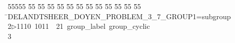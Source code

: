 %
%
\begin{tabbing}
55555 \= 55 \= 55 \= 55 \= 55 \= 55 \= 55 \= 55 \= 55 \= 55 \= 55 \= 55 \= 55 \= \>DELANDTSHEER\_DOYEN\_PROBLEM\_3\_7\_GROUP1=subgroup\ \\[0pt]
2\>$\triangleright$\>1110\ 1011\ \ 21\ group\_label\ group\_cyclic\\[0pt]
3\>\end{tabbing}
